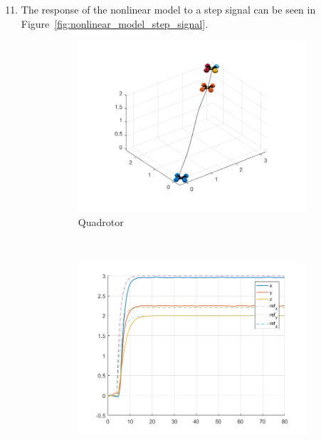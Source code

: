 \documentclass[11pt]{article}
\begin{document}
\begin{enumerate}
    \setcounter{enumi}{10}
    \item The response of the nonlinear model to a step signal can be
    seen in Figure~\ref{fig:nonlinear_model_step_signal}.
    \begin{figure}[ht]
        \centering
        \begin{subfigure}[c]{0.3\linewidth}
            \centering
            \includegraphics[width=\linewidth]{Plots_11_NonlinearModel_StepSignal/01}
            \caption{Quadrotor}
        \end{subfigure}
        ~
        \begin{subfigure}[c]{0.3\linewidth}
            \centering
            \includegraphics[width=\linewidth]{Plots_11_NonlinearModel_StepSignal/02}

\end{subfigure}
\end{figure}
\end{enumerate}
\end{document}
